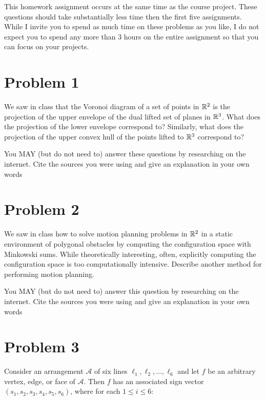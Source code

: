 \documentclass[11pt]{article}
\newcommand{\A}{{\mathcal{A}}}
\begin{document}


\vspace{1em}

This homework assignment occurs at the same time as the course project.  These
questions should take substantially less time then the first five assignments.
While I invite you to spend as much time on these problems as you like, I do not
expect you to spend any more than 3 hours on the entire assignment so that you
can focus on your projects.

\newpage
\section*{Problem 1}

We saw in class that the Voronoi diagram of a set of points in $\mathbb{R}^2$ is the
projection of the upper envelope of the dual lifted set of planes in $\mathbb{R}^3$.
What does the projection of the lower envelope correspond to? Similarly, what
does the projection of the upper convex hull of the points lifted to $\mathbb{R}^3$
correspond to?

You MAY (but do not need to) answer these questions by researching on the
internet. Cite the sources you were using and give an explanation in your own
words

\newpage
\section*{Problem 2}

We saw in class how to solve motion planning problems in $\mathbb{R}^2$ in a static
environment of polygonal obstacles by computing the configuration space with
Minkowski sums.  While theoretically interesting, often, explicitly computing
the configuration space is too computationally intensive.  Describe another
method for performing motion planning.

You MAY (but do not need to) answer this question by researching on the
internet. Cite the sources you were using and give an explanation in your own
words

\newpage
\section*{Problem 3}

Consider an arrangement $\A$ of six lines $\ell_1, \ell_2, \ldots, \ell_6$ and
let $f$ be an arbitrary vertex, edge, or face of $\A$. Then $f$ has an
associated sign vector $(s_1, s_2, s_3, s_4, s_5, s_6)$, where for each $1 \le i
\le 6$:
\end{document}
